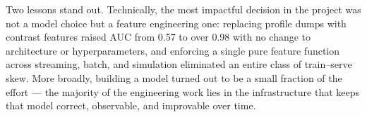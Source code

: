 Two lessons stand out. Technically, the most impactful decision in the project was not a model choice but a feature engineering one: replacing profile dumps with contrast features raised AUC from 0.57 to over 0.98 with no change to architecture or hyperparameters, and enforcing a single pure feature function across streaming, batch, and simulation eliminated an entire class of train--serve skew. More broadly, building a model turned out to be a small fraction of the effort --- the majority of the engineering work lies in the infrastructure that keeps that model correct, observable, and improvable over time.
